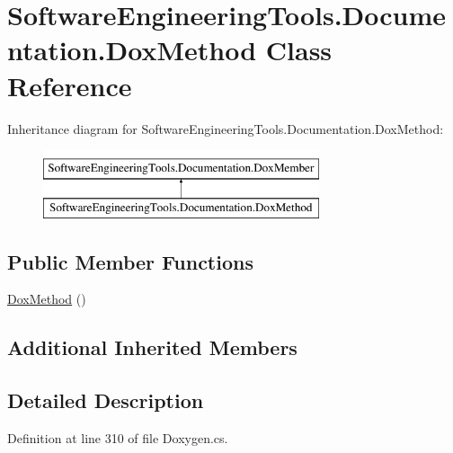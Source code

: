 \hypertarget{class_software_engineering_tools_1_1_documentation_1_1_dox_method}{\section{Software\+Engineering\+Tools.\+Documentation.\+Dox\+Method Class Reference}
\label{class_software_engineering_tools_1_1_documentation_1_1_dox_method}
}
Inheritance diagram for Software\+Engineering\+Tools.\+Documentation.\+Dox\+Method\+:\begin{figure}[H]
\begin{center}
\leavevmode
\includegraphics[height=2.000000cm]{class_software_engineering_tools_1_1_documentation_1_1_dox_method}
\end{center}
\end{figure}
\subsection*{Public Member Functions}
\begin{DoxyCompactItemize}
\item 
\hyperlink{class_software_engineering_tools_1_1_documentation_1_1_dox_method_a83be19465bd6a064277b73a4e5d0f4f8}{Dox\+Method} ()
\end{DoxyCompactItemize}
\subsection*{Additional Inherited Members}


\subsection{Detailed Description}


Definition at line 310 of file Doxygen.\+cs.




